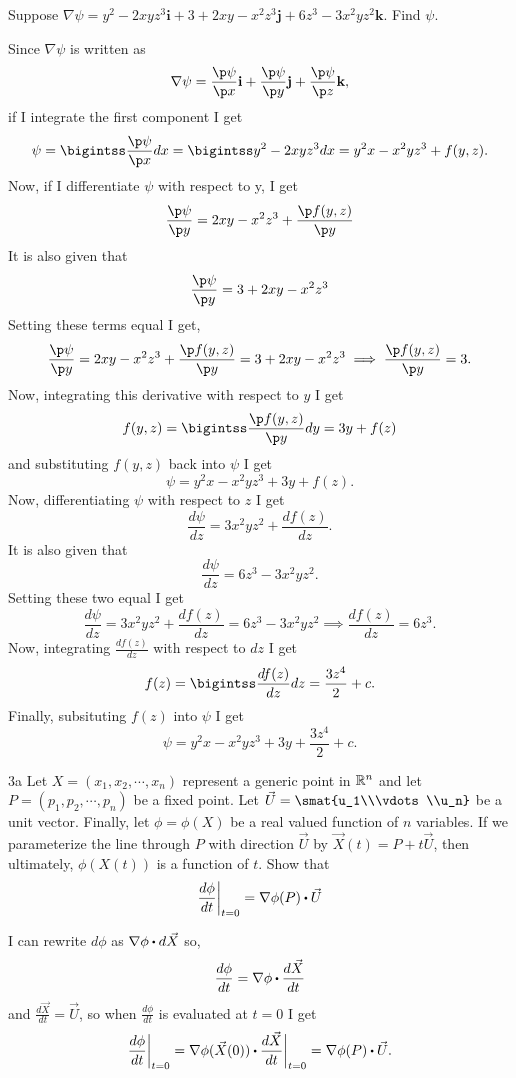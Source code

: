 \documentclass[titlepage]{article}
\begin{document}
\begin{problem}{2}
Suppose $\nabla\psi = y^2 - 2xyz^3\textbf{i} + 3+2xy-x^2z^3\textbf{j} + 6z^3-3x^2yz^2\textbf{k}.$ Find $\psi$.
\end{problem}
\begin{solution}
Since $\nabla\psi$ is written as
$$\nabla\psi = \frac{\p \psi}{\p x}\textbf{i} + \frac{\p \psi}{\p y}\textbf{j} +  \frac{\p \psi}{\p z}\textbf{k},$$
if I integrate the first component I get
$$\psi = \bigintss \frac{\p\psi}{\p x}dx= \bigintss y^2 -2xyz^3dx = y^2x - x^2yz^3 + f(y,z).$$
Now, if I differentiate $\psi$ with respect to y, I get
$$\frac{\p \psi}{\p y} = 2xy - x^2z^3 + \frac{\p f(y,z)}{\p y}$$
It is also given that
$$\frac{\p \psi}{\p y}= 3+ 2xy - x^2z^3$$
Setting these terms equal I get,
$$ \frac{\p \psi}{\p y} = 2xy - x^2z^3 + \frac{\p f(y,z)}{\p y} = 3+ 2xy - x^2z^3 \implies \frac{\p f(y,z)}{\p y} = 3.$$
Now, integrating this derivative with respect to $y$ I get
$$f(y,z) = \bigintss \frac{\p f(y,z)}{\p y} dy = 3y + f(z)$$
and substituting $f(y,z)$ back into $\psi$ I get
$$\psi =  y^2x-x^2yz^3+3y+f(z).$$
Now, differentiating $\psi$ with respect to $z$ I get
$$ \frac{d \psi}{d z} =  3x^2yz^2+\frac{df(z)}{dz}.$$
It is also given that 
$$\frac{d \psi}{d z} = 6z^3-3x^2yz^2.$$
Setting these two equal I get
$$ \frac{d \psi}{d z} =  3x^2yz^2+\frac{df(z)}{dz}= 6z^3-3x^2yz^2 \implies \frac{df(z)}{dz}=6z^3.$$
Now, integrating $\frac{df(z)}{dz}$ with respect to $dz$ I get
$$f(z) = \bigintss \frac{df(z)}{dz} dz = \frac{3z^4}{2}+ c.$$
Finally, subsituting $f(z)$ into $\psi$ I get 
$$\psi = y^2x-x^2yz^3+3y+\frac{3z^4}{2} + c.$$
\end{solution}

\begin{problem}{3a}
Let $X = (x_1,x_2,\cdots,x_n)$ represent a generic point in $\mathbb{R}^n$ and let $P=(p_1,p_2,\cdots,p_n)$ be a fixed point. Let $\vec{U} = \smat{u_1\\\vdots\\u_n}$ be a unit vector. Finally, let $\phi= \phi(X)$ be a real valued function of $n$ variables. If we parameterize the line through $P$ with direction $\vec{U}$ by $\vec{X}(t) = P + t\vec{U}$, then ultimately, $\phi(X(t))$ is a function of $t$. Show that 
$$\frac{d \phi}{dt}\bigg\rvert_{t=0} = \nabla\phi(P)\bigcdot\vec{U}$$
\end{problem}

\begin{solution}
I can rewrite $d\phi$ as $\nabla\phi \bigcdot d\vec{X}$ so, 
$$\frac{d\phi}{dt} = \nabla\phi \bigcdot \frac{d\vec{X}}{dt}$$
and $\frac{d\vec{X}}{dt} = \vec{U}$, so when $\frac{d\phi}{dt}$ is evaluated at $t=0$ I get
$$\frac{d\phi}{dt} \bigg\rvert_{t=0} = \nabla\phi(\vec{X}(0)) \bigcdot \frac{d\vec{X}}{dt}\bigg\rvert_{t=0} = \nabla\phi(P) \bigcdot \vec{U}.$$
\end{solution}
\end{document}

